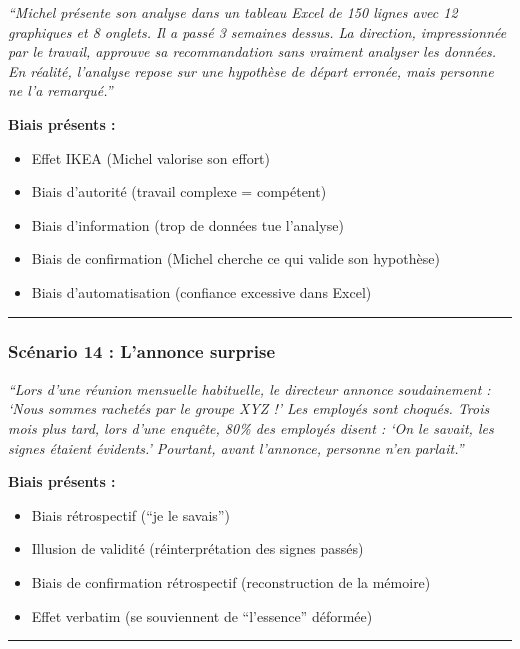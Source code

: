 \documentclass[
]{article}
\providecommand{\tightlist}{%
  \setlength{\itemsep}{0pt}\setlength{\parskip}{0pt}}
\begin{document}
\emph{``Michel présente son analyse dans un tableau Excel de 150 lignes
avec 12 graphiques et 8 onglets. Il a passé 3 semaines dessus. La
direction, impressionnée par le travail, approuve sa recommandation sans
vraiment analyser les données. En réalité, l'analyse repose sur une
hypothèse de départ erronée, mais personne ne l'a remarqué.''}

\textbf{Biais présents :}

\begin{itemize}
\tightlist
\item
  Effet IKEA (Michel valorise son effort)
\item
  Biais d'autorité (travail complexe = compétent)
\item
  Biais d'information (trop de données tue l'analyse)
\item
  Biais de confirmation (Michel cherche ce qui valide son hypothèse)
\item
  Biais d'automatisation (confiance excessive dans Excel)
\end{itemize}

\begin{center}\rule{0.5\linewidth}{0.5pt}\end{center}

\subsubsection{Scénario 14 : L'annonce
surprise}\label{scuxe9nario-14-lannonce-surprise}

\emph{``Lors d'une réunion mensuelle habituelle, le directeur annonce
soudainement : `Nous sommes rachetés par le groupe XYZ !' Les employés
sont choqués. Trois mois plus tard, lors d'une enquête, 80\% des
employés disent : `On le savait, les signes étaient évidents.' Pourtant,
avant l'annonce, personne n'en parlait.''}

\textbf{Biais présents :}

\begin{itemize}
\tightlist
\item
  Biais rétrospectif (``je le savais'')
\item
  Illusion de validité (réinterprétation des signes passés)
\item
  Biais de confirmation rétrospectif (reconstruction de la mémoire)
\item
  Effet verbatim (se souviennent de ``l'essence'' déformée)
\end{itemize}

\begin{center}\rule{0.5\linewidth}{0.5pt}\end{center}
\end{document}
